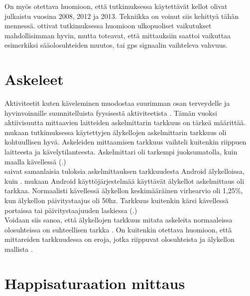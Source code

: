 \documentclass[utf8,bachelor,finnish]{bachelor}
\begin{document}
    On myös otettava huomioon, että tutkimuksessa käytettävät kellot olivat julkaistu vuosina 2008, 2012 ja 2013. Tekniikka on voinut siis kehittyä tähän mennessä. 
     \textcite{ammann_accuracy_2016} ottivat tutkimuksessa huomioon ulkopuoliset vaikutukset mahdollisimman hyvin, mutta toteavat, että mittauksiin
      saattoi vaikuttaa esimerkiksi sääolosuhteiden muutos, tai gps signaalin vaihteleva vahvuus.\\

  \section{Askeleet}
  Aktiviteetit kuten käveleminen muodostaa suurimman osan terveydelle ja hyvinvoinnille suunnitelluista fyysisestä aktiviteetista \parencite{gaz_determining_2018}.
   Tämän vuoksi aktiivisuutta mittaavien laitteiden askelmittarin tarkkuus on tärkeä määrittää.
    \textcite{gaz_determining_2018} mukaan tutkimuksessa käytettyjen älykellojen askelmittarin tarkkuus oli kohtuullisen hyvä. Askeleiden mittaamisen tarkkuus
     vaihteli kuitenkin riippuen laitteesta ja kävelytilanteesta. Askelmittari oli tarkempi juoksumatolla, kuin
      maalla kävellessä (\textcite{gaz_determining_2018}.)\\
  
  \textcite{ahanathapillai_preliminary_2015} saivat samanlaisia tuloksia askelmittauksen tarkkuudesta Android älykelloissa, kuin \textcite{gaz_determining_2018}.
    \textcite{ahanathapillai_preliminary_2015} mukaan Android käyttöjärjestelmää käyttävät älykellot askelmittaus oli tarkkaa.
      Normaalisti kävellessä älykellon keskimääräinen virhearvio oli 1,25\%, kun älykellon päivitystaajus oli 50hz.
       Tarkkuus kuitenkin kärsi kävellessä portaissa tai päivitystaajuuden laskiessa (\textcite{ahanathapillai_preliminary_2015}.)\\
  
  Voidaan siis sanoa, että älykellojen tarkkuus mitata askeleita normaaleissa olosuhteissa on suhteellisen tarkka \parencite{gaz_determining_2018,ahanathapillai_preliminary_2015}.
   On kuitenkin otettava huomioon, että mittareiden tarkkuudessa on eroja, jotka riippuvat olosuhteista ja älykellon mallista \parencite{gaz_determining_2018}.
  

  \section{Happisaturaation mittaus}
\end{document}
